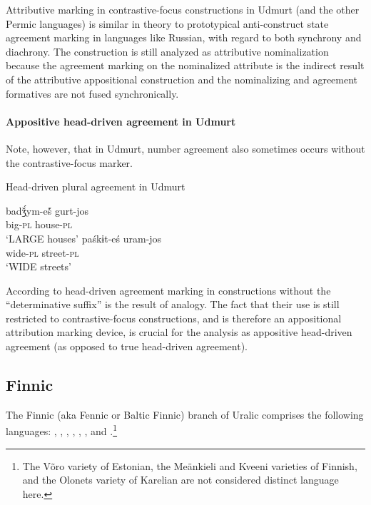 Attributive marking in contrastive-focus constructions in Udmurt (and the other Permic languages) is similar in theory to prototypical anti-construct state agreement marking in languages like Russian, with regard to both synchrony and diachrony. The construction is still analyzed as attributive nominalization because the agreement marking on the nominalized attribute is the indirect result of the attributive appositional construction and the nominalizing and agreement formatives are not fused synchronically.

\paragraph{Appositive head-driven agreement in Udmurt}
Note, however, that in Udmurt, number agreement also sometimes occurs without the contrastive-focus marker.
\begin{exe}
\ex \rm{Head-driven plural agreement in Udmurt}
\begin{xlist}
\ex 
\gll	badǯ́ym-eš́ gurt-jos\\
	big-\textsc{pl} house-\textsc{pl}\\
\glt	‘LARGE houses’ \citep[40]{winkler2001}
\ex 
\gll	paśkɨt-eś uram-jos\\
	wide-\textsc{pl} street-\textsc{pl}\\
\glt	‘WIDE streets’ \citep[63]{csucs1990}
\end{xlist}
\end{exe}
According to \citet[63]{csucs1990} head-driven agreement marking in constructions without the “determinative suffix” is the result of analogy. The fact that their use is still restricted to contrastive-focus constructions, and is therefore an appositional attribution marking device, is crucial for the analysis as appositive head-driven agreement (as opposed to true head-driven agreement).

\subsection{Finnic}
The Finnic (aka Fennic or Baltic Finnic) branch of Uralic comprises the following languages: , , , , , ,  and .\footnote{The Võro variety of Estonian, the Meänkieli and Kveeni varieties of Finnish, and the Olonets variety of Karelian are not considered distinct language here.}

